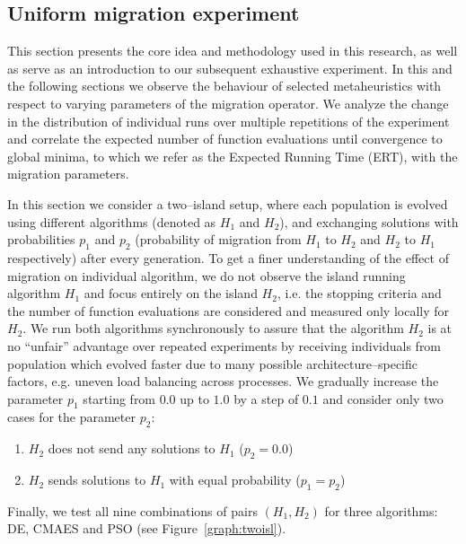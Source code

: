 \documentclass{sig-alternate}
\begin{document}
\subsection{Uniform migration experiment}
This section presents the core idea and methodology used in this research, as well as serve as an introduction to our subsequent exhaustive experiment.
In this and the following sections we observe the behaviour of selected metaheuristics with respect to varying parameters of the migration operator.
We analyze the change in the distribution of individual runs over multiple repetitions of the experiment and correlate the expected number of function evaluations until convergence to global minima, to which we refer as the Expected Running Time (ERT), with the migration parameters.

In this section we consider a two--island setup, where each population is evolved using different algorithms (denoted as $H_1$ and $H_2$), and exchanging solutions with probabilities $p_1$ and $p_2$ (probability of migration from $H_1$ to $H_2$ and $H_2$ to $H_1$ respectively) after every generation.
To get a finer understanding of the effect of migration on individual algorithm, we do not observe the island running algorithm $H_1$ and focus entirely on the island $H_2$, i.e. the stopping criteria and the number of function evaluations are considered and measured only locally for $H_2$.
We run both algorithms synchronously to assure that the algorithm $H_2$ is at no  ``unfair'' advantage over repeated experiments by receiving individuals from population which evolved faster due to many possible architecture--specific factors, e.g. uneven load balancing across processes.
We gradually increase the parameter $p_1$ starting from $0.0$ up to $1.0$ by a step of $0.1$ and consider only two cases for the parameter $p_2$: 
\begin{enumerate}
    \item $H_2$ does not send any solutions to $H_1$ ($p_2 = 0.0$)
    \item $H_2$ sends solutions to $H_1$ with equal probability ($p_1 = p_2$)
\end{enumerate}
Finally, we test all nine combinations of pairs $(H_1, H_2)$ for three algorithms: DE, CMAES and PSO (see Figure~\ref{graph:twoisl}).
\end{document}
